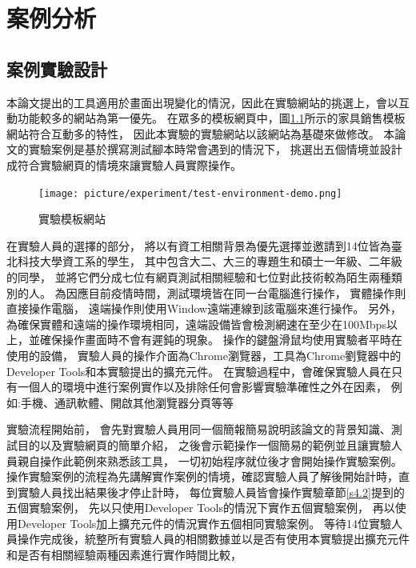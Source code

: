 \chapter{案例分析}
\section{案例實驗設計}\label{s4.1}
\indent
本論文提出的工具適用於畫面出現變化的情況，因此在實驗網站的挑選上，會以互動功能較多的網站為第一優先。
在眾多的模板網頁中，圖\ref{f4.1}所示的家具銷售模板網站\cite{Furn-Free-CSS-Template}符合互動多的特性，
因此本實驗的實驗網站以該網站為基礎來做修改。
本論文的實驗案例是基於撰寫測試腳本時常會遇到的情況下，
挑選出五個情境並設計成符合實驗網頁的情境來讓實驗人員實際操作。

\begin{figure}[H]
    \centering
    \setlength{\abovecaptionskip}{-5pt}
    \setlength{\belowcaptionskip}{0pt}
    \texttt{[image: picture/experiment/test-environment-demo.png]}
    \caption{實驗模板網站}
    \label{f4.1}
\end{figure}

在實驗人員的選擇的部分，
將以有資工相關背景為優先選擇並邀請到14位皆為臺北科技大學資工系的學生，
其中包含大二、大三的專題生和碩士一年級、二年級的同學，
並將它們分成七位有網頁測試相關經驗和七位對此技術較為陌生兩種類別的人。
為因應目前疫情時間，測試環境皆在同一台電腦進行操作，
實體操作則直接操作電腦，
遠端操作則使用Window遠端連線到該電腦來進行操作。
另外，為確保實體和遠端的操作環境相同，遠端設備皆會檢測網速在至少在100Mbps以上，並確保操作畫面時不會有遲鈍的現象。
操作的鍵盤滑鼠均使用實驗者平時在使用的設備，
實驗人員的操作介面為Chrome瀏覽器，工具為Chrome劉覽器中的Developer Tools和本實驗提出的擴充元件。
在實驗過程中，會確保實驗人員在只有一個人的環境中進行案例實作以及排除任何會影響實驗準確性之外在因素，
例如:手機、通訊軟體、開啟其他瀏覽器分頁等等

實驗流程開始前，
會先對實驗人員用同一個簡報簡易說明該論文的背景知識、測試目的以及實驗網頁的簡單介紹，
之後會示範操作一個簡易的範例並且讓實驗人員親自操作此範例來熟悉該工具，
一切初始程序就位後才會開始操作實驗案例。
操作實驗案例的流程為先講解實作案例的情境，確認實驗人員了解後開始計時，直到實驗人員找出結果後才停止計時，
每位實驗人員皆會操作實驗章節\ref{s4.2}提到的五個實驗案例，
先以只使用Developer Tools的情況下實作五個實驗案例，
再以使用Developer Tools加上擴充元件的情況實作五個相同實驗案例。
等待14位實驗人員操作完成後，統整所有實驗人員的相關數據並以是否有使用本實驗提出擴充元件和是否有相關經驗兩種因素進行實作時間比較，

